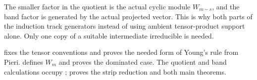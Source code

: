 The smaller factor in the quotient is the actual cyclic module $W_{m-s}$,
and the band factor is generated by the actual projected vector.
This is why both parts of the induction track generators instead of
using ambient tensor-product support alone. Only one copy of a suitable
intermediate irreducible is needed.

 fixes the tensor conventions and proves the
needed form of Young's rule from Pieri.  defines
$W_m$ and proves the dominated case. The quotient and band calculations
occupy ;
 proves the strip reduction and both main theorems.
